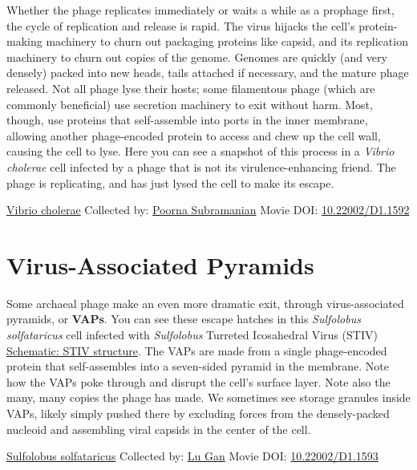 \documentclass[]{tufte-book}
\begin{document}
Whether the phage replicates immediately or waits a while as a prophage first, the cycle of replication and release is rapid. The virus hijacks the cell's protein-making machinery to churn out packaging proteins like capsid, and its replication machinery to churn out copies of the genome. Genomes are quickly (and very densely) packed into new heads, tails attached if necessary, and the mature phage released. Not all phage lyse their hosts; some filamentous phage (which are commonly beneficial) use secretion machinery to exit without harm. Most, though, use proteins that self-assemble into ports in the inner membrane, allowing another phage-encoded protein to access and chew up the cell wall, causing the cell to lyse. Here you can see a snapshot of this process in a \emph{Vibrio cholerae} cell infected by a phage that is not its virulence-enhancing friend. The phage is replicating, and has just lysed the cell to make its escape.



\hypertarget{htmlwidget-8d6f3fd4e1083d559f02}{}

\label{fig:10-7}\protect\hyperlink{tree}{Vibrio cholerae} Collected by: \protect\hyperlink{poorna_subramanian}{Poorna Subramanian} Movie DOI: \href{https://doi.org/10.22002/D1.1592}{10.22002/D1.1592}

\hypertarget{virus-associated-pyramids}{%
\section{Virus-Associated Pyramids}\label{virus-associated-pyramids}}

Some archaeal phage make an even more dramatic exit, through virus-associated pyramids, or \textbf{VAPs}. You can see these escape hatches in this \emph{Sulfolobus solfataricus} cell infected with \emph{Sulfolobus} Turreted Icosahedral Virus (STIV) \protect\hyperlink{STIV_structure}{Schematic: STIV structure}. The VAPs are made from a single phage-encoded protein that self-assembles into a seven-sided pyramid in the membrane. Note how the VAPs poke through and disrupt the cell's surface layer. Note also the many, many copies the phage has made. We sometimes see storage granules inside VAPs, likely simply pushed there by excluding forces from the densely-packed nucleoid and assembling viral capsids in the center of the cell.



\hypertarget{htmlwidget-3c1989c6f178d9fc9bfe}{}

\label{fig:10-8}\protect\hyperlink{tree}{Sulfolobus solfataricus} Collected by: \protect\hyperlink{lu_gan}{Lu Gan} Movie DOI: \href{https://doi.org/10.22002/D1.1593}{10.22002/D1.1593}
\end{document}
